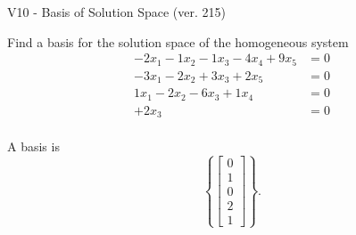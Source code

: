 \begin{exercise}
  \begin{exerciseTitle}V10 - Basis of Solution Space (ver. 215)\end{exerciseTitle}
  \begin{exerciseStatement}
    Find a basis for the solution space of the homogeneous system 
\begin{align*}
 -2 x_ 1 -1 x_ 2 -1 x_ 3 -4 x_ 4 + 9 x_ 5 &= 0  \\ 
  -3 x_ 1 -2 x_ 2 + 3 x_ 3 + 2 x_ 5 &= 0  \\ 
  1 x_ 1 -2 x_ 2 -6 x_ 3 + 1 x_ 4 &= 0  \\ 
  + 2 x_ 3 &= 0  \\ 
 \end{align*}


 
  \end{exerciseStatement}

  \begin{exerciseAnswer}
   A basis is   
\[\left\{\left[\begin{array}{c}
0 \\
1 \\
0 \\
2 \\
1
\end{array}\right]\right\}.\]

  


  \end{exerciseAnswer}
\end{exercise}